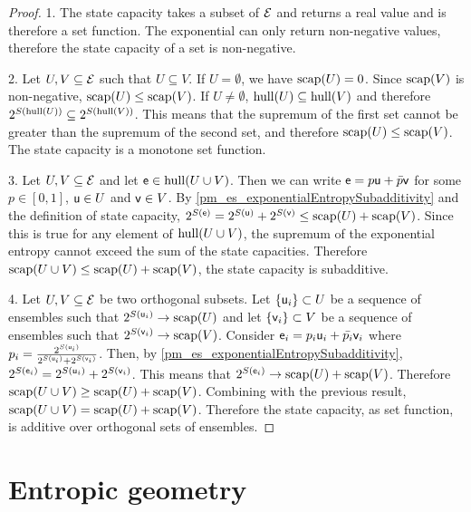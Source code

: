 \begin{proof}
	1. The state capacity takes a subset of $\Ens$ and returns a real value and is therefore a set function. The exponential can only return non-negative values, therefore the state capacity of a set is non-negative. 
	
	2. Let $U, V \subseteq \Ens$ such that $U \subseteq V$. If $U = \emptyset$, we have $\capacity(U) = 0$. Since $\capacity(V)$ is non-negative, $\capacity(U) \leq \capacity(V)$. If $U \neq \emptyset$, $\hull(U) \subseteq \hull(V)$ and therefore $2^{S(\hull(U))} \subseteq 2^{S(\hull(V))}$. This means that the supremum of the first set cannot be greater than the supremum of the second set, and therefore $\capacity(U) \leq \capacity(V)$. The state capacity is a monotone set function.
	
	3. Let $U, V \subseteq \Ens$ and let $\ens \in \hull(U \cup V)$. Then we can write $\ens = p \ens[u] + \bar{p} \ens[v]$ for some $p \in [0,1]$, $\ens[u] \in U$ and $\ens[v] \in V$. By \ref{pm_es_exponentialEntropySubadditivity} and the definition of state capacity, $2^{S(\ens)} = 2^{S(\ens[u])} + 2^{S(\ens[v])} \leq \capacity(U) + \capacity(V)$. Since this is true for any element of $\hull(U \cup V)$, the supremum of the exponential entropy cannot exceed the sum of the state capacities. Therefore $\capacity(U \cup V) \leq \capacity(U) + \capacity(V)$, the state capacity is subadditive.
	
	4. Let $U, V \subseteq \Ens$ be two orthogonal subsets. Let $\{\ens[u]_i\} \subset U$ be a sequence of ensembles such that $2^{S(\ens[u]_i)} \to \capacity(U)$ and let $\{\ens[v]_i\} \subset V$ be a sequence of ensembles such that $2^{S(\ens[v]_i)} \to \capacity(V)$. Consider $\ens_i = p_i \ens[u]_i + \bar{p_i} \ens[v]_i$ where $p_i = \frac{2^{S(\ens[u]_i)}}{2^{S(\ens[u]_i)} + 2^{S(\ens[v]_i)}}$. Then, by \ref{pm_es_exponentialEntropySubadditivity}, $2^{S(\ens_i)} = 2^{S(\ens[u]_i)} + 2^{S(\ens[v]_i)}$. This means that $2^{S(\ens_i)} \to \capacity(U) + \capacity(V)$. Therefore $\capacity(U \cup V) \geq \capacity(U) + \capacity(V)$. Combining with the previous result, $\capacity(U \cup V) = \capacity(U) + \capacity(V)$. Therefore the state capacity, as set function, is additive over orthogonal sets of ensembles.
\end{proof}

\section{Entropic geometry}

